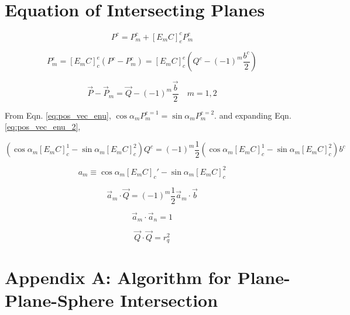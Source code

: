 \documentclass[12pt]{article}
\begin{document}
	\section{Equation of Intersecting Planes}
	\begin{equation}
	P^c = P_m^c + \left[ E_m C \right]_e^c P_m^e
	\end{equation}
	
	\begin{equation}
	P_m^e = \left[ E_m C \right]_c^e \left( P^c - P_m^c \right) = \left[ E_m C \right]_c^e \left( Q^c - (-1)^m \frac{b^c}{2} \right)
	\label{eq:pos_vec_enu_2}
	\end{equation}
	
	\begin{equation}
	\vec{P} - \vec{P}_m = \vec{Q} - (-1)^m \frac{\vec{b}}{2} \quad m = 1, 2
	\end{equation}
	
	From Eqn. \ref{eq:pos_vec_enu},
	$
	\cos\alpha_m P_m^{e=1} = \sin\alpha_m P_m^{e=2}.
	$
	and expanding Eqn. \ref{eq:pos_vec_enu_2},
	
	\begin{equation}
		\left( \cos\alpha_m \left[ E_m C \right]_c^1 - \sin\alpha_m \left[ E_m C \right]_c^2 \right) Q^c = 
		 (-1)^{m} \frac{1}{2} \left( \cos\alpha_m \left[ E_m C \right]_c^1 - \sin\alpha_m \left[ E_m C \right]_c^2 \right) b^c
	\end{equation}
	
	\begin{equation}
	a_m \equiv \cos \alpha_m \left[ E_m C \right]_c' - \sin \alpha_m \left[ E_m C \right]_c^2
	\end{equation}
	
	\begin{equation}
	\vec{a}_m \cdot \vec{Q} = (-1)^m \frac{1}{2} \vec{a}_m \cdot \vec{b}
	\end{equation}
	
	\begin{equation}
	\vec{a}_m \cdot \vec{a}_n = 1
	\end{equation}
	
	\begin{equation}
	\vec{Q} \cdot \vec{Q} = r_q^2
	\end{equation}
	

	\section{Appendix A: Algorithm for Plane-Plane-Sphere Intersection \cite{OpenAI2023}}
	
\end{document}
